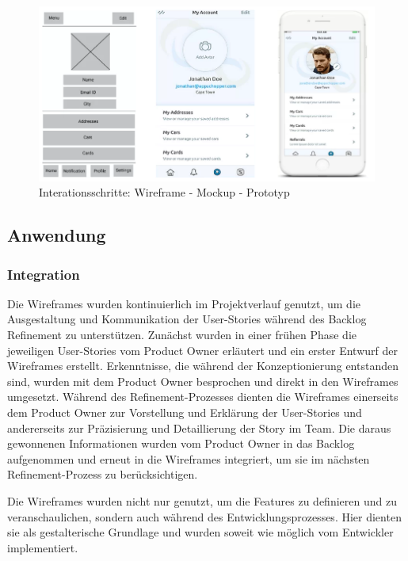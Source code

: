 \begin{figure}[!htb]
    \centering
    \includegraphics[scale=2]{figures/jan/Wire_Fixes-Wire-prototyp.png}
    \caption[Interationsschritte an einem Beispiel: Wireframe - Mockup - Prototyp]{Interationsschritte: Wireframe - Mockup - Prototyp \cite{LfwHfwMoc}}
    \label{fig:image}
\end{figure}

\subsection{Anwendung}
\subsubsection{Integration}

Die Wireframes wurden kontinuierlich im Projektverlauf genutzt, um die Ausgestaltung und Kommunikation der User-Stories während des Backlog Refinement zu unterstützen. Zunächst wurden in einer frühen Phase die jeweiligen User-Stories vom Product Owner erläutert und ein erster Entwurf der Wireframes erstellt. Erkenntnisse, die während der Konzeptionierung entstanden sind, wurden mit dem Product Owner besprochen und direkt in den Wireframes umgesetzt.
Während des Refinement-Prozesses dienten die Wireframes einerseits dem Product Owner zur Vorstellung und Erklärung der User-Stories und andererseits zur Präzisierung und Detaillierung der Story im Team. Die daraus gewonnenen Informationen wurden vom Product Owner in das Backlog aufgenommen und erneut in die Wireframes integriert, um sie im nächsten Refinement-Prozess zu berücksichtigen.

Die Wireframes wurden nicht nur genutzt, um die Features zu definieren und zu veranschaulichen, sondern auch während des Entwicklungsprozesses. Hier dienten sie als gestalterische Grundlage und wurden soweit wie möglich vom Entwickler implementiert.

